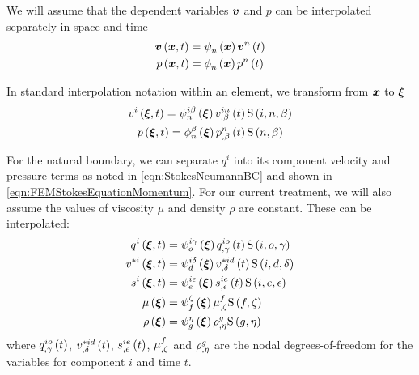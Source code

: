 We will assume that the dependent variables $\vectr{v}$ and $p$ can be
interpolated separately in space and time \ie
\begin{gather}
  \fnof{\vectr{v}}{\vectr{x},t}=\gbfn{n}{}{\vectr{x}}\fnof{\nodept{\vectr{v}}{n}}{t}\\
  \fnof{p}{\vectr{x},t}=\altgbfn{n}{}{\vectr{x}}\fnof{\nodept{p}{n}}{t}
\end{gather}

In standard interpolation notation within an element, we transform from
$\vectr{x}$ to $\vectr{\xi}$ \ie
\begin{gather}
  \fnof{v^{i}}{\vectr{\xi},t}=\idxgbfn{i}{n}{\beta}{\vectr{\xi}}
  \fnof{\idxnodedof{v}{i}{n}{\beta}}{t}\idxgsf{i}{n}{\beta}\\
  \fnof{p}{\vectr{\xi},t}=\altgbfn{n}{\beta}{\vectr{\xi}}
  \fnof{\nodedof{p}{n}{\beta}}{t}\gsf{n}{\beta}
\end{gather}

For the natural boundary, we can separate $q^{i}$ into its component velocity
and pressure terms as noted in \ref{eqn:StokesNeumannBC} and shown in
\ref{eqn:FEMStokesEquationMomentum}. For our current treatment, we will also assume the values
of viscosity $\mu$ and density $\rho$ are constant. These can be interpolated:
\begin{equation}
  \begin{split}
    \fnof{q^{i}}{\vectr{\xi},t} &= \idxgbfn{i}{o}{\gamma}{\vectr{\xi}}
    \fnof{\idxnodedof{q}{i}{o}{\gamma}}{t}\idxgsf{i}{o}{\gamma} \\
    \fnof{v^{*i}}{\vectr{\xi},t} &=\idxgbfn{i}{d}{\delta}{\vectr{\xi}}
    \fnof{\idxnodedof{v}{*i}{d}{\delta}}{t}\idxgsf{i}{d}{\delta} \\
    \fnof{s^{i}}{\vectr{\xi},t} &=\idxgbfn{i}{e}{\epsilon}{\vectr{\xi}}
    \fnof{\idxnodedof{s}{i}{e}{\epsilon}}{t}\idxgsf{i}{e}{\epsilon} \\
    \fnof{\mu}{\vectr{\xi}} &=\gbfn{f}{\zeta}{\vectr{\xi}}
    \nodedof{\mu}{f}{\zeta}\gsf{f}{\zeta} \\
    \fnof{\rho}{\vectr{\xi}} &=\gbfn{g}{\eta}{\vectr{\xi}}\nodedof{\rho}{g}{\eta}
    \gsf{g}{\eta}
  \end{split}
\end{equation}
where $\fnof{\idxnodedof{q}{i}{o}{\gamma}}{t}$,
$\fnof{\idxnodedof{v}{*i}{d}{\delta}}{t}$, 
$\fnof{\idxnodedof{s}{i}{e}{\epsilon}}{t}$, $\nodedof{\mu}{f}{\zeta}$
and $\nodedof{\rho}{g}{\eta}$ are the nodal degrees-of-freedom for the
variables for component $i$ and time $t$.

